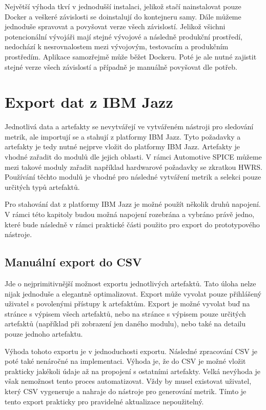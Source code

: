 \documentclass[czech,master]{diploma}
\begin{document}
Největší výhoda tkví v jednodušší instalaci, jelikož stačí nainstalovat pouze Docker a veškeré závislosti se doinstalují do kontejneru samy. Dále můžeme jednoduše spravovat a povyšovat verze všech závislostí. Jelikož všichni potencionální vývojáři mají stejné vývojové a následně produkční prostředí, nedochází k nesrovnalostem mezi vývojovým, testovacím a produkčním prostředím. Aplikace samozřejmě může běžet Dockeru. Poté je ale nutné zajistit stejné verze všech závislostí a případně je manuálně povyšovat dle potřeb.



\section{Export dat z IBM Jazz}
\label{sec:ibm_export}
Jednotlivá data a artefakty se nevytvářejí ve vytvářeném nástroji pro sledování metrik, ale importují se a stahují z platformy IBM Jazz. Tyto požadavky a artefakty je tedy nutné nejprve vložit do platformy IBM Jazz. Artefakty je vhodné zařadit do modulů dle jejich oblasti. V rámci Automotive SPICE můžeme mezi takové moduly zařadit například hardwarové požadavky se zkratkou HWRS. Používání těchto modulů je vhodné pro následné vytváření metrik a selekci pouze určitých typů artefaktů.

Pro stahování dat z platformy IBM Jazz je možné použít několik druhů napojení. V rámci této kapitoly budou možná napojení rozebrána a vybráno právě jedno, které bude následně v rámci praktické části použito pro export do prototypového nástroje.

\subsection{Manuální export do CSV}
Jde o nejprimitivnější možnost exportu jednotlivých artefaktů. Tato úloha nelze nijak jednoduše a elegantně optimalizovat. Export může vyvolat pouze přihlášený uživatel s povolenými přístupy k artefaktům. Export je možné vyvolat buď na stránce s výpisem všech artefaktů, nebo na stránce s výpisem pouze určitých artefaktů (například při zobrazení jen daného modulu), nebo také na detailu pouze jednoho artefaktu.

Výhoda tohoto exportu je v jednoduchosti exportu. Následné zpracování CSV je poté také nenáročné na implementaci. Výhoda je, že do CSV je možné vložit prakticky jakékoli údaje až na propojení s ostatními artefakty. Velká nevýhoda je však nemožnost tento proces automatizovat. Vždy by musel existovat uživatel, který CSV vygeneruje a nahraje do nástroje pro generování metrik. Tímto je tento export prakticky pro pravidelné aktualizace nepoužitelný.
\end{document}
